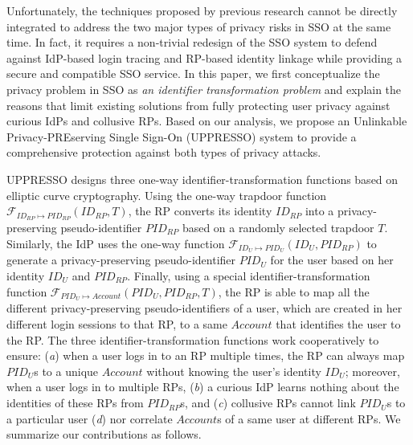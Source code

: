 Unfortunately, the techniques proposed by previous research cannot be directly integrated to address the two major types of privacy risks in SSO at the same time. In fact, it requires a non-trivial redesign of the SSO system to defend against IdP-based login tracing and RP-based identity linkage while providing a secure and compatible SSO service. In this paper, we first conceptualize the privacy problem in SSO as {\em an identifier transformation problem} and explain the reasons that limit existing solutions from fully protecting user privacy against curious IdPs and collusive RPs. Based on our analysis, we propose an Unlinkable Privacy-PREserving Single Sign-On (UPPRESSO) system to provide a comprehensive protection against both types of privacy attacks.

UPPRESSO designs three one-way identifier-transformation functions based on elliptic curve cryptography. Using the one-way trapdoor function $\mathcal{F}_{ID_{RP} \mapsto PID_{RP}}(ID_{RP}, T)$, the RP converts its identity $ID_{RP}$ into a privacy-preserving pseudo-identifier $PID_{RP}$ based on a randomly selected trapdoor $T$. Similarly, the IdP uses the one-way function  $\mathcal{F}_{ID_{U} \mapsto PID_{U}}(ID_U, PID_{RP})$ to generate a privacy-preserving pseudo-identifier $PID_U$ for the user based on her identity $ID_U$ and $PID_{RP}$. Finally, using a special identifier-transformation function $\mathcal{F}_{PID_{U} \mapsto Account}(PID_U, PID_{RP}, T)$, the RP is able to map all the different privacy-preserving pseudo-identifiers of a user, which are created in her different login sessions to that RP, to a same $Account$ that identifies the user to the RP. The three identifier-transformation functions work cooperatively to ensure: (\emph{a}) when a user logs in to an RP multiple times, the RP can always map $PID_U$s to a unique $Account$ without knowing the user's identity $ID_U$; moreover, when a user logs in to multiple RPs, (\emph{b}) a curious IdP learns nothing about the identities of these RPs from $PID_{RP}$s, and (\emph{c}) collusive RPs cannot link $PID_U$s to a particular user %
(\emph{d}) nor correlate $Account$s of a same user at different RPs.
We summarize our contributions as follows.
